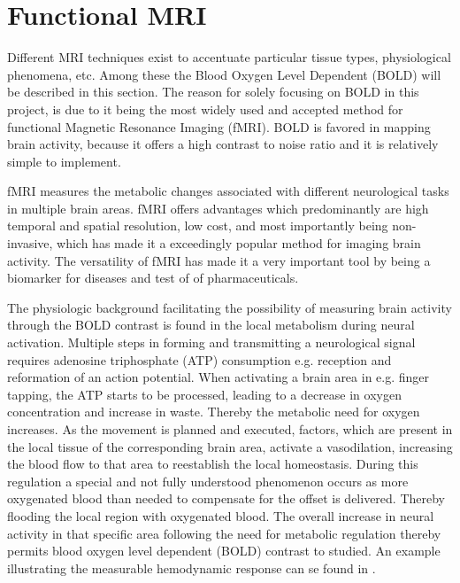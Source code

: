 \section{Functional MRI} \label{sec:fMRI}

Different MRI techniques exist to accentuate particular tissue types, physiological phenomena, etc. Among these the Blood Oxygen Level Dependent (BOLD) will be described in this section. The reason for solely focusing on BOLD in this project, is due to it being the most widely used and accepted method for functional Magnetic Resonance Imaging (fMRI). BOLD is favored in mapping brain activity, because it offers a high contrast to noise ratio and it is relatively simple to implement. \cite{Lee2002}    
 
fMRI measures the metabolic changes associated with different neurological tasks in multiple brain areas. fMRI offers advantages which predominantly are high temporal and spatial resolution, low cost, and most importantly being non-invasive, which has made it a exceedingly popular method for imaging brain activity. The versatility of fMRI has made it a very important tool by being a biomarker for diseases and test of of pharmaceuticals. \cite{Glover2011} 

The physiologic background facilitating the possibility of measuring brain activity through the BOLD contrast is found in the local metabolism during neural activation. Multiple steps in forming and transmitting a neurological signal requires adenosine triphosphate (ATP) consumption e.g. reception and reformation of an action potential. When activating a brain area in e.g. finger tapping, the ATP starts to be processed, leading to a decrease in oxygen concentration and increase in waste. Thereby the metabolic need for oxygen increases. As the movement is planned and executed, factors, which are present in the local tissue of the corresponding brain area, activate a vasodilation, increasing the blood flow to that area to reestablish the local homeostasis. During this regulation a special and not fully understood phenomenon occurs as more oxygenated blood than needed to compensate for the offset is delivered. Thereby flooding the local region with oxygenated blood. The overall increase in neural activity in that specific area following the need for metabolic regulation thereby permits blood oxygen level dependent (BOLD) contrast to studied. An example illustrating the measurable hemodynamic response can se found in . \cite{Glover2011,Poldrack2011}

